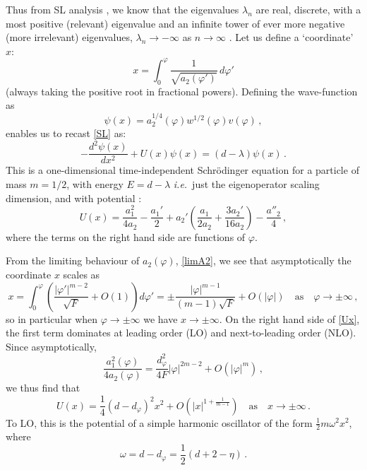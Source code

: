\documentclass[11pt,a4paper]{article}
\numberwithin{figure}{section}
\numberwithin{equation}{section}
\newcommand{\be}{\begin{equation}}
\newcommand{\ee}{\end{equation}}
\newcommand\ie{\textit{i.e.}\ }
\newcommand{\ph}{\varphi}
\begin{document}
Thus from SL analysis \cite{Ince1956}, we know that the eigenvalues $\lambda_n$ are real, discrete, with a most positive (relevant) eigenvalue and an infinite tower of ever more negative (more irrelevant) eigenvalues, $\lambda_n\to-\infty$ as $n\to\infty$ \cite{Morris:1996xq}. Let us define a `coordinate' $x$:
\begin{equation}
    x = \int_0^\ph \frac{1}{\sqrt{a_2(\ph')}}\, d \ph' \label{x}
\end{equation}
(always taking the positive root in fractional powers).
Defining the wave-function as
\begin{equation}
\label{psi}
    \psi(x) = a_2^{1/4}(\ph)w^{1/2}(\ph)v(\ph)\,,
\end{equation}
enables us to recast \eqref{SL} as:
\begin{equation}
    -\frac{d^2\psi(x)}{dx^2}+U(x)\psi(x)=(d-\lambda)\psi(x) \,. \label{shrod}
\end{equation}
This is a one-dimensional time-independent Schrödinger equation for a particle of mass $m=1/2$, with energy $E=d-\lambda$ \ie just the eigenoperator scaling dimension, and with potential \cite{Benedetti:2013jk,Mitchell:2021qjr,Morris:2022btf}:
\begin{equation}
    U(x)=\frac{a_1^2}{4a_2}-\frac{a_1'}{2}+a_2'\left(\frac{a_1}{2a_2}+\frac{3a_2'}{16a_2}\right)-\frac{a''_2}{4}\,, \label{Ux}
\end{equation}
where the terms on the right hand side are functions of $\ph$. 

From the limiting behaviour of $a_2(\ph)$, \eqref{limA2}, we see that asymptotically the coordinate $x$ scales as
\begin{equation}
\label{largex}
    x = \int_0^\ph \left( \frac{|\ph'|^{m-2}}{\sqrt{F}} + O(1) \right) d\ph' = \pm \frac{|\ph|^{m-1}}{(m-1)\sqrt{F}} +O(|\ph|) \quad \text{as} \quad \ph \rightarrow \pm\infty \,,
\end{equation}
so in particular when $\ph \rightarrow \pm \infty$ we have $x\rightarrow \pm \infty$.
On the right hand side of \eqref{Ux}, the first term dominates at leading order (LO) and next-to-leading order (NLO). Since asymptotically,
\be \frac{a_1^2(\ph)}{4a_2(\ph)}=\frac{d_\ph^2}{4F}|\ph|^{2m-2} +O(|\ph|^m)\,, \ee
we thus find that
\begin{equation} \label{Uasymp}
    U(x) = \frac{1}{4}(d-d_\ph)^2 x^2 +O(|x|^{1 + \frac{1}{m-1}}) \quad \text{as} \quad x \rightarrow \pm \infty \,.
\end{equation}
To LO, this is the potential of a simple harmonic oscillator of the form $\frac{1}{2}m\omega^2x^2$, where 
\be \label{omega}\omega = d-d_\ph = \frac12(d+2-\eta)\,. \ee
\end{document}
